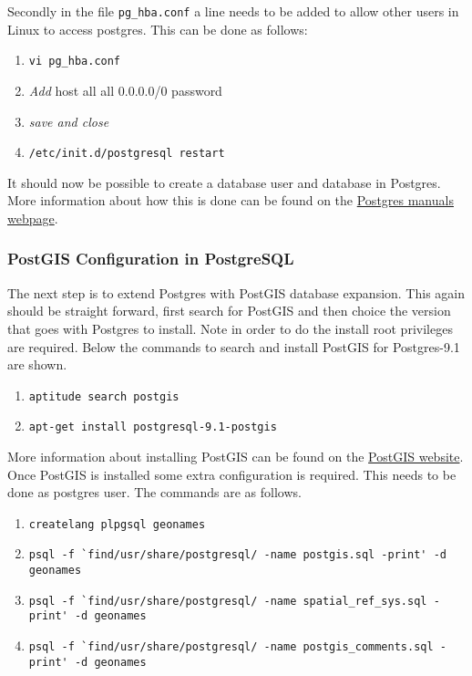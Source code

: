 \noindent Secondly in the file \lstinline|pg_hba.conf| a line needs to be added to allow other users in Linux to access postgres. This can be done as follows:

\begin{enumerate}[resume]
	\item \lstinline|vi pg_hba.conf|
	\item \textit{Add} host all	all 0.0.0.0/0 password
	\item \textit{save and close}
	\item \lstinline|/etc/init.d/postgresql restart|
\end{enumerate}

\noindent It should now be possible to create a database user and database in Postgres. More information about how this is done can be found on the \href{http://www.postgresql.org/docs/manuals/}{Postgres manuals webpage}.

\subsubsection{PostGIS Configuration in PostgreSQL}
The next step is to extend Postgres with PostGIS database expansion. This again should be straight forward, first search for PostGIS and then choice the version that goes with Postgres to install. Note in order to do the install root privileges are required. Below the commands to search and install PostGIS for Postgres-9.1 are shown.

\begin{enumerate}
	\item \lstinline|aptitude search postgis|
	\item \lstinline|apt-get install postgresql-9.1-postgis|
\end{enumerate} 

\noindent More information about installing PostGIS  can be found on the \href{http://www.postgis.net/install}{PostGIS website}.
\newline
\newline
Once PostGIS is installed some extra configuration is required. This needs to be done as postgres user. The commands are as follows.

\begin{enumerate}	
	\item \lstinline|createlang plpgsql geonames|
	\item \lstinline|psql -f `find/usr/share/postgresql/ -name postgis.sql -print' -d geonames|
	\item \lstinline|psql -f `find/usr/share/postgresql/ -name spatial_ref_sys.sql -print' -d geonames|
	\item \lstinline|psql -f `find/usr/share/postgresql/ -name postgis_comments.sql -print' -d geonames|
\end{enumerate}

